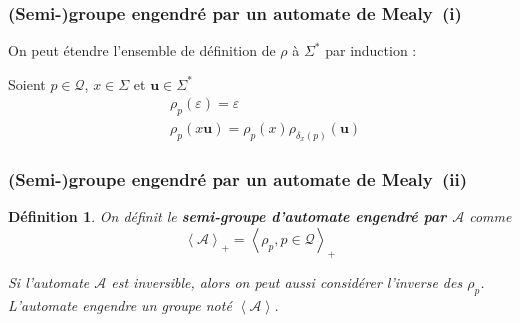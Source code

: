 \documentclass[11pt]{beamer}
\newtheorem{defi}{Définition}
\begin{document}
\begin{frame}
  \frametitle{(Semi-)groupe engendré par un automate de Mealy~(i)}

  On peut étendre l'ensemble de définition de $\rho$ à $\Sigma^*$ par induction :

  Soient $p\in\mathcal{Q}$, $x\in\Sigma$ et $\textbf{u}\in\Sigma^*$
  \begin{align*}
    &\rho_p(\varepsilon)=\varepsilon \\
    &\rho_p(x\textbf{u})=\rho_p(x)\rho_{\delta_x(p)}(\textbf{u})
  \end{align*}


  \begin{figure}[!ht]
    \begin{center}
    \end{center}
  \end{figure}
\end{frame}

\begin{frame}
  \frametitle{(Semi-)groupe engendré par un automate de Mealy~(ii)}

  \begin{defi}
    On définit le \textbf{semi-groupe d'automate engendré par $\mathcal{A}$} comme
    \begin{equation*}
      \left<\mathcal{A}\right>_+=\left<\rho_p, p\in\mathcal{Q}\right>_+
    \end{equation*}

    Si l'automate $\mathcal{A}$ est inversible, alors on peut aussi considérer l'inverse des $\rho_p$. L'automate engendre un groupe noté $\left<\mathcal{A}\right>$.

  \end{defi}
\end{frame}
\end{document}
